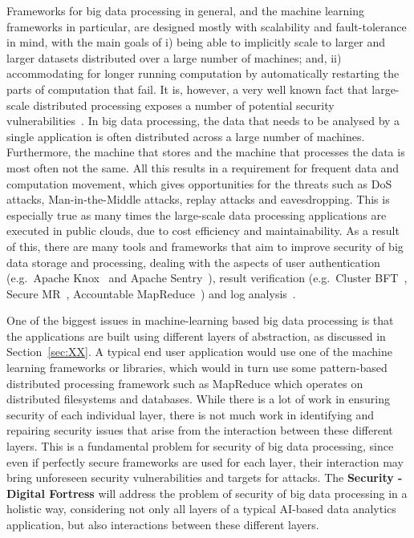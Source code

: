 \documentclass[a4paper,11pt]{article}
\newcommand{\project}[1]{\textbf{#1}\xspace}
\newcommand{\SECURITY}{\project{Security - Digital Fortress}}
\newcommand{\TheProject}{\SECURITY}
\begin{document}
Frameworks for big data processing in general, and the machine learning frameworks in particular, are designed mostly with scalability and fault-tolerance in mind, with the main goals of i) being able to implicitly scale to larger and larger datasets distributed over a large number of machines; and, ii) accommodating for longer running computation by automatically restarting the parts of computation that fail. It is, however, a very well known fact that large-scale distributed processing exposes a number of potential security vulnerabilities~\cite{bigdatasecurity}. In big data processing, the data that needs to be analysed by a single application is often distributed across a large number of machines. Furthermore, the machine that stores and the machine that processes the data is most often not the same. All this results in a requirement for frequent data and computation movement, which gives opportunities for the threats such as DoS attacks, Man-in-the-Middle attacks, replay attacks and eavesdropping. This is especially true as many times the large-scale data processing applications are executed in public clouds, due to cost efficiency and maintainability. As a result of this, there are many tools and frameworks that aim to improve security of big data storage and processing, dealing with the aspects of user authentication (e.g.~Apache Knox~\cite{knox} and Apache Sentry~\cite{sentry}), result verification (e.g.~Cluster BFT~\cite{bft}, Secure MR~\cite{securemr}, Accountable MapReduce~\cite{accountablemr}) and log analysis~\cite{loganalysis}. 

One of the biggest issues in machine-learning based big data processing is that the applications are built using different layers of abstraction, as discussed in Section~\ref{sec:XX}. A typical end user application would use one of the machine learning frameworks or libraries, which would in turn use some pattern-based distributed processing framework such as MapReduce which operates on distributed filesystems and databases. While there is a lot of work in ensuring security of each individual layer, there is not much work in identifying and repairing security issues that arise from the interaction between these different layers. This is a fundamental problem for security of big data processing, since even if perfectly secure frameworks are used for each layer, their interaction may bring unforeseen security vulnerabilities and targets for attacks. The \TheProject{} will address the problem of security of big data processing in a holistic way, considering not only all layers of a typical AI-based data analytics application, but also interactions between these different layers.
\end{document}
